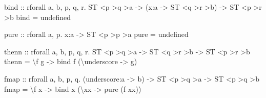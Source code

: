 \documentclass[
]{darts-v2021}
\newenvironment{Shaded}{}{}
\newcommand{\DataTypeTok}[1]{\textcolor[rgb]{0.56,0.13,0.00}{#1}}
\newcommand{\FunctionTok}[1]{\textcolor[rgb]{0.02,0.16,0.49}{#1}}
\newcommand{\NormalTok}[1]{#1}
\newcommand{\OperatorTok}[1]{\textcolor[rgb]{0.40,0.40,0.40}{#1}}
\newcommand{\OtherTok}[1]{\textcolor[rgb]{0.00,0.44,0.13}{#1}}
\begin{document}
\begin{Shaded}
\begin{Highlighting}[numbers=left,,firstnumber=13,]
\OtherTok{bind ::}\NormalTok{ rforall a, b, p, q, r}\OperatorTok{.}
  \DataTypeTok{ST} \OperatorTok{\textless{}}\NormalTok{p }\OperatorTok{\textgreater{}}\NormalTok{q }\OperatorTok{\textgreater{}}\NormalTok{a }\OtherTok{{-}\textgreater{}}
\NormalTok{  (x}\OperatorTok{:}\NormalTok{a }\OtherTok{{-}\textgreater{}} \DataTypeTok{ST} \OperatorTok{\textless{}}\NormalTok{q }\OperatorTok{\textgreater{}}\NormalTok{r }\OperatorTok{\textgreater{}}\NormalTok{b) }\OtherTok{{-}\textgreater{}}
  \DataTypeTok{ST} \OperatorTok{\textless{}}\NormalTok{p }\OperatorTok{\textgreater{}}\NormalTok{r }\OperatorTok{\textgreater{}}\NormalTok{b}
\NormalTok{bind }\OtherTok{=} \FunctionTok{undefined}

\FunctionTok{pure}\OtherTok{ ::}\NormalTok{ rforall a, p}\OperatorTok{.}\NormalTok{ x}\OperatorTok{:}\NormalTok{a }\OtherTok{{-}\textgreater{}} \DataTypeTok{ST} \OperatorTok{\textless{}}\NormalTok{p }\OperatorTok{\textgreater{}}\NormalTok{p }\OperatorTok{\textgreater{}}\NormalTok{a}
\FunctionTok{pure} \OtherTok{=} \FunctionTok{undefined}

\OtherTok{thenn ::}\NormalTok{ rforall a, b, p, q, r}\OperatorTok{.}
  \DataTypeTok{ST} \OperatorTok{\textless{}}\NormalTok{p }\OperatorTok{\textgreater{}}\NormalTok{q }\OperatorTok{\textgreater{}}\NormalTok{a }\OtherTok{{-}\textgreater{}}
  \DataTypeTok{ST} \OperatorTok{\textless{}}\NormalTok{q }\OperatorTok{\textgreater{}}\NormalTok{r }\OperatorTok{\textgreater{}}\NormalTok{b }\OtherTok{{-}\textgreater{}}
  \DataTypeTok{ST} \OperatorTok{\textless{}}\NormalTok{p }\OperatorTok{\textgreater{}}\NormalTok{r }\OperatorTok{\textgreater{}}\NormalTok{b}
\NormalTok{thenn }\OtherTok{=}\NormalTok{ \textbackslash{}f g }\OtherTok{{-}\textgreater{}}\NormalTok{ bind f (\textbackslash{}underscore }\OtherTok{{-}\textgreater{}}\NormalTok{ g)}

\FunctionTok{fmap}\OtherTok{ ::}\NormalTok{ rforall a, b, p, q}\OperatorTok{.}
\NormalTok{  (underscore}\OperatorTok{:}\NormalTok{a }\OtherTok{{-}\textgreater{}}\NormalTok{ b) }\OtherTok{{-}\textgreater{}}
  \DataTypeTok{ST} \OperatorTok{\textless{}}\NormalTok{p }\OperatorTok{\textgreater{}}\NormalTok{q }\OperatorTok{\textgreater{}}\NormalTok{a }\OtherTok{{-}\textgreater{}}
  \DataTypeTok{ST} \OperatorTok{\textless{}}\NormalTok{p }\OperatorTok{\textgreater{}}\NormalTok{q }\OperatorTok{\textgreater{}}\NormalTok{b}
\FunctionTok{fmap} \OtherTok{=}\NormalTok{ \textbackslash{}f x }\OtherTok{{-}\textgreater{}}\NormalTok{ bind x (\textbackslash{}xx }\OtherTok{{-}\textgreater{}} \FunctionTok{pure}\NormalTok{ (f xx))}
\end{Highlighting}
\end{Shaded}
\end{document}
